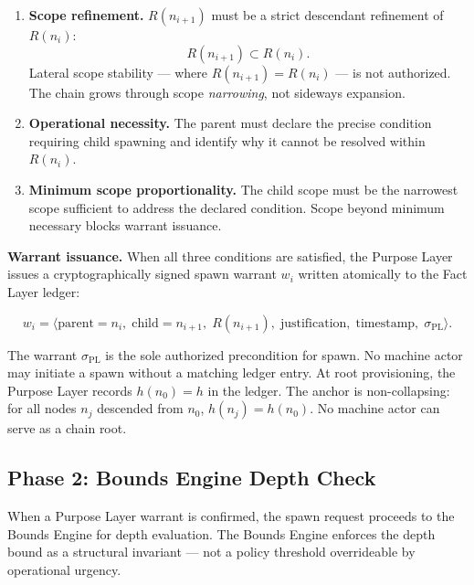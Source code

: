 \begin{enumerate}
    \item[(P1)] \textbf{Scope refinement.} $R(n_{i+1})$ must be a strict descendant refinement of $R(n_i)$:
    \begin{equation}
    R(n_{i+1}) \subset R(n_i).
    \label{eq:rs-scope-refinement}
    \end{equation}
    Lateral scope stability — where $R(n_{i+1}) = R(n_i)$ — is not authorized. The chain grows through scope \emph{narrowing}, not sideways expansion.

    \item[(P2)] \textbf{Operational necessity.} The parent must declare the precise condition requiring child spawning and identify why it cannot be resolved within $R(n_i)$.

    \item[(P3)] \textbf{Minimum scope proportionality.} The child scope must be the narrowest scope sufficient to address the declared condition. Scope beyond minimum necessary blocks warrant issuance.
\end{enumerate}

\medskip
\noindent\textbf{Warrant issuance.} When all three conditions are satisfied, the Purpose Layer issues a cryptographically signed spawn warrant $w_i$ written atomically to the Fact Layer ledger:

\begin{equation}
w_i = \bigl\langle
\text{parent}=n_i,\;
\text{child}=n_{i+1},\;
R(n_{i+1}),\;
\text{justification},\;
\text{timestamp},\;
\sigma_{\text{PL}}
\bigr\rangle .
\label{eq:rs-warrant}
\end{equation}

The warrant $\sigma_{\text{PL}}$ is the sole authorized precondition for spawn. No machine actor may initiate a spawn without a matching ledger entry. At root provisioning, the Purpose Layer records $h(n_0) = h$ in the ledger. The anchor is non-collapsing: for all nodes $n_j$ descended from $n_0$, $h(n_j) = h(n_0)$. No machine actor can serve as a chain root.

\subsection{Phase 2: Bounds Engine Depth Check}
\label{sec:rs-phase2}

When a Purpose Layer warrant is confirmed, the spawn request proceeds to the Bounds Engine for depth evaluation. The Bounds Engine enforces the depth bound as a structural invariant — not a policy threshold overrideable by operational urgency.

